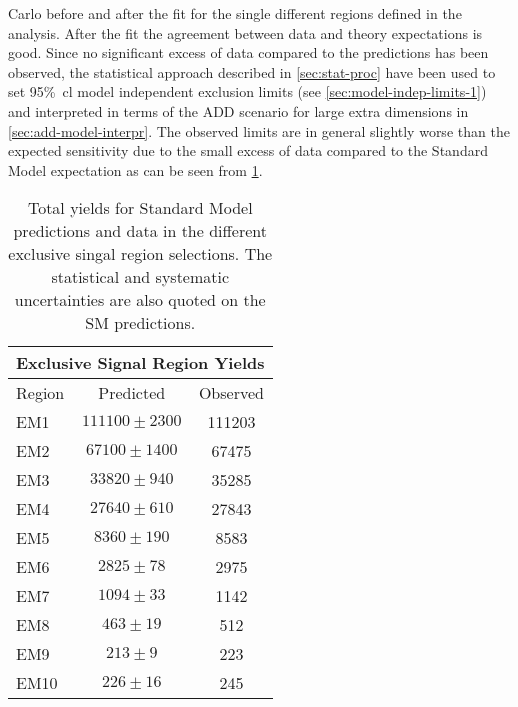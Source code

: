 Carlo before and after the fit for the single different regions defined in the
analysis. After the fit the agreement between data and theory expectations is
good. Since no significant excess of data compared to the predictions has been
observed, the statistical approach described in \cref{sec:stat-proc} have been
used to set 95\%~\gls{cl} model independent exclusion limits (see
\cref{sec:model-indep-limits-1}) and interpreted in terms of the ADD scenario
for large extra dimensions in \cref{sec:add-model-interpr}. The observed limits
are in general slightly worse than the expected sensitivity due to the small
excess of data compared to the Standard Model expectation as can be seen from
\cref{tab:sr_yields}.
\begin{table}[!h]
  \centering
  \begin{tabular}{lcc}
    \toprule
    \multicolumn{3}{c}{Exclusive Signal Region Yields} \\
    \midrule \midrule
    Region & Predicted & Observed \\
    \midrule
    EM1 & $111100 \pm 2300$ & 111203 \\
    EM2 & $67100 \pm 1400$ & 67475 \\
    EM3 & $33820 \pm 940$ & 35285 \\
    EM4 & $27640 \pm 610$ & 27843 \\
    EM5 & $8360 \pm 190$ & 8583 \\
    EM6 & $2825 \pm 78$ & 2975 \\
    EM7 & $1094 \pm 33$ & 1142 \\
    EM8 & $463 \pm 19$ & 512 \\
    EM9 & $213 \pm 9$ & 223 \\
    EM10 & $226 \pm 16$ & 245 \\
    \bottomrule
  \end{tabular}
  \caption{Total yields for Standard Model predictions and data in the different
    exclusive singal region selections. The statistical and systematic
    uncertainties are also quoted on the SM predictions.}
  \label{tab:sr_yields}
\end{table}
